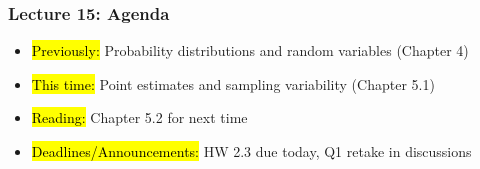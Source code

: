 
\begin{frame}
    \frametitle{Lecture 15: Agenda}
    \begin{itemize}
        \item \hl{Previously: }Probability distributions and random variables (Chapter 4)
        \item \hl{This time: }Point estimates and sampling variability (Chapter 5.1)
        \item \hl{Reading: }Chapter 5.2 for next time
        \item \hl{Deadlines/Announcements: }HW 2.3 due today, Q1 retake in discussions
    \end{itemize}
    
\end{frame}
    
